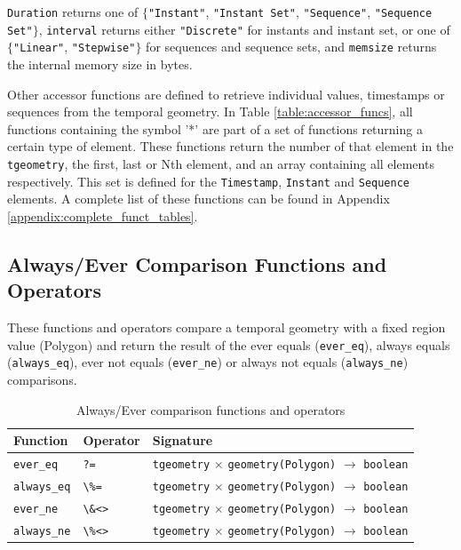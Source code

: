 \lstinline{Duration} returns one of $\{$\lstinline{"Instant"}, \lstinline{"Instant Set"}, \lstinline{"Sequence"}, \lstinline{"Sequence Set"}$\}$, \lstinline{interval} returns either \lstinline{"Discrete"} for instants and instant set, or one of $\{$\lstinline{"Linear"}, \lstinline{"Stepwise"}$\}$ for sequences and sequence sets, and \lstinline{memsize} returns the internal memory size in bytes.

Other accessor functions are defined to retrieve individual values, timestamps or sequences from the temporal geometry. In Table \ref{table:accessor_funcs}, all functions containing the symbol '*' are part of a set of functions returning a certain type of element. These functions return the number of that element in the \lstinline+tgeometry+, the first, last or Nth element, and an array containing all elements respectively. This set is defined for the \lstinline{Timestamp}, \lstinline{Instant} and \lstinline{Sequence} elements. A complete list of these functions can be found in Appendix \ref{appendix:complete_funct_tables}.

\subsection{Always/Ever Comparison Functions and Operators}
\label{section:always_ever}

These functions and operators compare a temporal geometry with a fixed region value (Polygon) and return the result of the ever equals (\lstinline+ever_eq+), always equals (\lstinline+always_eq+), ever not equals (\lstinline+ever_ne+) or always not equals (\lstinline+always_ne+) comparisons. \\

\begin{table}[h!]
    \centering
    \begin{tabularx}{\textwidth}{|l|l|X|}
    \hline
    \textbf{Function}   & \textbf{Operator} & \textbf{Signature} \\
    \hline
    \lstinline+ever_eq+    & \lstinline+?=+      & \lstinline+tgeometry+ $\times$ \lstinline+geometry(Polygon)+ $\rightarrow$ \lstinline+boolean+ \\
    \hline
    \lstinline+always_eq+  & \lstinline+\%=+     & \lstinline+tgeometry+ $\times$ \lstinline+geometry(Polygon)+ $\rightarrow$ \lstinline+boolean+ \\
    \hline
    \lstinline+ever_ne+    & \lstinline+\&<>+    & \lstinline+tgeometry+ $\times$ \lstinline+geometry(Polygon)+ $\rightarrow$ \lstinline+boolean+ \\
    \hline
    \lstinline+always_ne+  & \lstinline+\%<>+    & \lstinline+tgeometry+ $\times$ \lstinline+geometry(Polygon)+ $\rightarrow$ \lstinline+boolean+ \\
    \hline
    \end{tabularx}
    \caption{Always/Ever comparison functions and operators}
    \label{table:always_ever_funcs}
\end{table}

